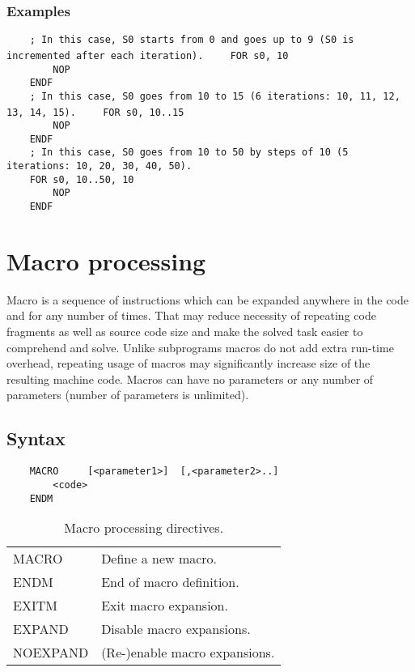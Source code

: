         \subsubsection{Examples}
            \verb'    ; In this case, S0 starts from 0 and goes up to 9 (S0 is incremented after each iteration).'
            \verb'    FOR s0, 10'\\
            \verb'        NOP'\\
            \verb'    ENDF'
            \verb''\\
            \verb'    ; In this case, S0 goes from 10 to 15 (6 iterations: 10, 11, 12, 13, 14, 15).'
            \verb'    FOR s0, 10..15'\\
            \verb'        NOP'\\
            \verb'    ENDF'
            \verb''\\
            \verb'    ; In this case, S0 goes from 10 to 50 by steps of 10 (5 iterations: 10, 20, 30, 40, 50).'\\
            \verb'    FOR s0, 10..50, 10'\\
            \verb'        NOP'\\
            \verb'    ENDF'

\clearpage
\section{Macro processing}
    Macro is a sequence of instructions which can be expanded anywhere in the code and for any number of times. That may reduce necessity of repeating code fragments as well as source code size and make the solved task easier to comprehend and solve. Unlike subprograms macros do not add extra run-time overhead, repeating usage of macros may significantly increase size of the resulting machine code. Macros can have no parameters or any number of parameters (number of parameters is unlimited).

    \subsection{Syntax}
        \verb'    MACRO     [<parameter1>]  [,<parameter2>..]'\\
        \verb'        <code>'\\
        \verb'    ENDM'

        \begin{table}[h!]
            \begin{tabular}{|ll|}
                \hline
                MACRO      & Define a new macro. \\
                ENDM       & End of macro definition. \\
                EXITM      & Exit macro expansion. \\
                EXPAND     & Disable macro expansions.\\
                NOEXPAND   & (Re-)enable macro expansions.\\
                \hline
            \end{tabular}
            \caption{Macro processing directives.}
        \end{table}

